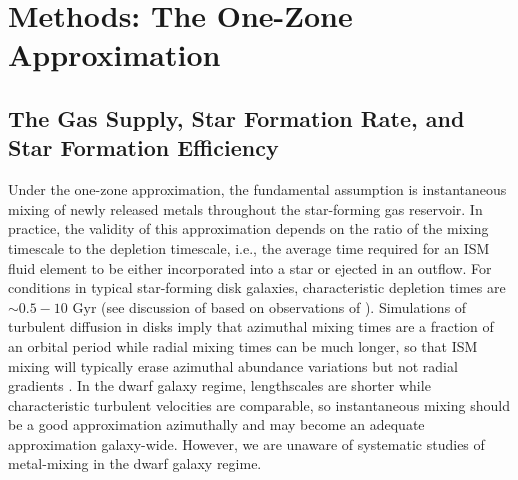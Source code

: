 
\section{Methods: The One-Zone Approximation}
\label{bursts:sec:methods}
\subsection{The Gas Supply, Star Formation Rate, and Star Formation Efficiency}
Under the one-zone approximation, the fundamental assumption is instantaneous 
mixing of newly released metals throughout the star-forming gas reservoir. 
In practice, the validity of this approximation depends on the ratio
of the mixing timescale to the depletion timescale, i.e., the average 
time required for an ISM fluid element to be either incorporated into
a star or ejected in an outflow.  For conditions in typical star-forming
disk galaxies, characteristic depletion times are $\sim 0.5-10\text{ Gyr}$
(see discussion of \citet{Weinberg2017b} based on observations
of \citealt{Leroy2008}).  Simulations of turbulent diffusion in disks
imply that azimuthal mixing times are a fraction of an orbital period
while radial mixing times can be much longer, so that ISM mixing will
typically erase azimuthal abundance variations but not radial
gradients \citep{Petit2015,Krumholz2018a}.
In the dwarf galaxy regime, lengthscales are shorter while characteristic
turbulent velocities are comparable, so instantaneous mixing should
be a good approximation azimuthally and may become an adequate 
approximation galaxy-wide.  However, we are unaware of systematic
studies of metal-mixing in the dwarf galaxy regime.

